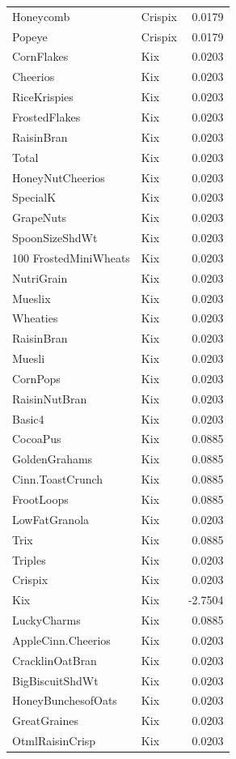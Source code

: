 \begin{longtable}{llr}
Honeycomb & Crispix & 0.0179 \\
Popeye & Crispix & 0.0179 \\
CornFlakes & Kix & 0.0203 \\
Cheerios & Kix & 0.0203 \\
RiceKrispies & Kix & 0.0203 \\
FrostedFlakes & Kix & 0.0203 \\
RaisinBran & Kix & 0.0203 \\
Total & Kix & 0.0203 \\
HoneyNutCheerios & Kix & 0.0203 \\
SpecialK & Kix & 0.0203 \\
GrapeNuts & Kix & 0.0203 \\
SpoonSizeShdWt & Kix & 0.0203 \\
100%
FrostedMiniWheats & Kix & 0.0203 \\
NutriGrain & Kix & 0.0203 \\
Mueslix & Kix & 0.0203 \\
Wheaties & Kix & 0.0203 \\
RaisinBran & Kix & 0.0203 \\
Muesli & Kix & 0.0203 \\
CornPops & Kix & 0.0203 \\
RaisinNutBran & Kix & 0.0203 \\
Basic4 & Kix & 0.0203 \\
CocoaPus & Kix & 0.0885 \\
GoldenGrahams & Kix & 0.0885 \\
Cinn.ToastCrunch & Kix & 0.0885 \\
FrootLoops & Kix & 0.0885 \\
LowFatGranola & Kix & 0.0203 \\
Trix & Kix & 0.0885 \\
Triples & Kix & 0.0203 \\
Crispix & Kix & 0.0203 \\
Kix & Kix & -2.7504 \\
LuckyCharms & Kix & 0.0885 \\
AppleCinn.Cheerios & Kix & 0.0203 \\
CracklinOatBran & Kix & 0.0203 \\
BigBiscuitShdWt & Kix & 0.0203 \\
HoneyBunchesofOats & Kix & 0.0203 \\
GreatGraines & Kix & 0.0203 \\
OtmlRaisinCrisp & Kix & 0.0203 \\

\end{longtable}
